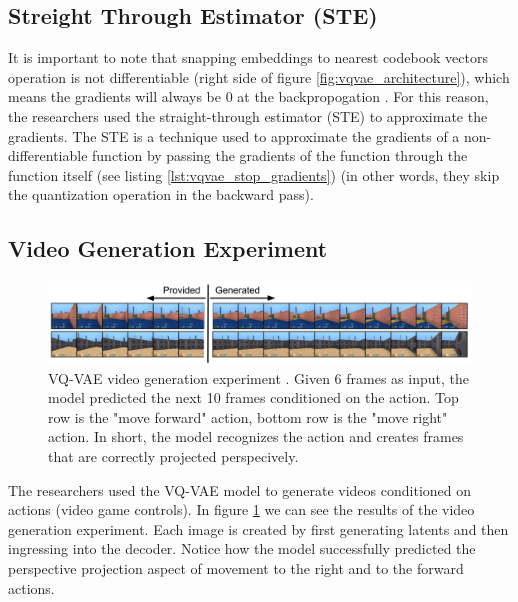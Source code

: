 \subsection{Streight Through Estimator (STE)}

It is important to note that snapping embeddings to nearest codebook vectors operation is not differentiable (right side of figure \ref{fig:vqvae_architecture}), which means the gradients will always be 0 at the backpropogation \cite{why_round_function_is_not_differentiable}. For this reason, the researchers used the straight-through estimator (STE) to approximate the gradients. The STE is a technique used to approximate the gradients of a non-differentiable function by passing the gradients of the function through the function itself (see listing \ref{lst:vqvae_stop_gradients}) (in other words, they skip the quantization operation in the backward pass).

\subsection{Video Generation Experiment}


\begin{figure}[h]
    \centering
    \includegraphics[width=\textwidth]{images/vqvae_video_generation.png}
    \caption{VQ-VAE video generation experiment \cite{vqvae}. Given 6 frames as input, the model predicted the next 10 frames conditioned on the action. Top row is the "move forward" action, bottom row is the "move right" action. In short, the model recognizes the action and creates frames that are correctly projected perspecively.}
    \label{fig:vqvae_video_generation}
\end{figure}

The researchers used the VQ-VAE model to generate videos conditioned on actions (video game controls). In figure \ref{fig:vqvae_video_generation} we can see the results of the video generation experiment. Each image is created by first generating latents and then ingressing into the decoder. Notice how the model successfully predicted the perspective projection aspect of movement to the right and to the forward actions.
